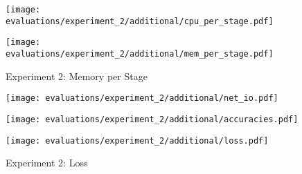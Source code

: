 \begin{figure}[p]
    \begin{adjustwidth}{-0.2\paperwidth}{-0.2\paperwidth}
        \centering
        \texttt{[image: evaluations/experiment\_2/additional/cpu\_per\_stage.pdf]}
        \caption{Experiment 2: CPU per Stage}
        \label{fig:eval_2_cpu_per_stage}
    \end{adjustwidth}

    \begin{adjustwidth}{-0.2\paperwidth}{-0.2\paperwidth}
        \centering
        \texttt{[image: evaluations/experiment\_2/additional/mem\_per\_stage.pdf]}
        \caption{Experiment 2: Memory per Stage}
        \label{fig:eval_2_memory_per_stage}
    \end{adjustwidth}
\end{figure}

\begin{figure}[p]
    \centering
    \begin{adjustwidth}{-0.2\paperwidth}{-0.2\paperwidth}
        \centering
        \texttt{[image: evaluations/experiment\_2/additional/net\_io.pdf]}
        \caption{Experiment 2: Network-IO}
        \label{fig:eval_2_net_io}
    \end{adjustwidth}

        \texttt{[image: evaluations/experiment\_2/additional/accuracies.pdf]}
        \caption{Experiment 2: Accuracies}
        \label{fig:eval_2_accuracies}

        \texttt{[image: evaluations/experiment\_2/additional/loss.pdf]}
        \caption{Experiment 2: Loss}
        \label{fig:eval_2_loss}
\end{figure}


